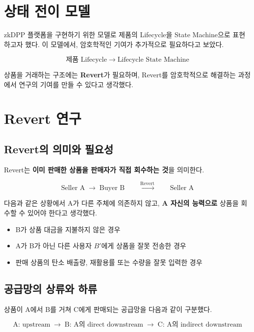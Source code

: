 \documentclass[11pt,a4paper]{extarticle}
\begin{document}
\section{상태 전이 모델}

zkDPP 플랫폼을 구현하기 위한 모델로 제품의 Lifecycle을 State Machine으로
표현하고자 했다. 이 모델에서, 암호학적인 기여가 추가적으로 필요하다고 보았다.

\[
  \boxed{\text{제품 Lifecycle}}
  \;\longrightarrow\;
  \boxed{\text{Lifecycle State Machine}}
\]

상품을 거래하는 구조에는 \textbf{Revert}가 필요하며, Revert를 암호학적으로
해결하는 과정에서 연구의 기여를 만들 수 있다고 생각했다.

\section{Revert 연구}

\subsection{Revert의 의미와 필요성}

Revert는 \textbf{이미 판매한 상품을 판매자가 직접 회수하는 것}을 의미한다.

\[
  \boxed{\text{Seller A}}
  \;\longrightarrow\;
  \boxed{\text{Buyer B}}
  \qquad
  \overset{\text{Revert}}{\longrightarrow}
  \qquad
  \boxed{\text{Seller A}}
\]

다음과 같은 상황에서 A가 다른 주체에 의존하지 않고, \textbf{A 자신의
  능력으로} 상품을 회수할 수 있어야 한다고 생각했다.

\begin{itemize}
  \item B가 상품 대금을 지불하지 않은 경우
  \item A가 B가 아닌 다른 사용자 \(B'\)에게 상품을 잘못 전송한 경우
  \item 판매 상품의 탄소 배출량, 재활용률 또는 수량을 잘못 입력한 경우
\end{itemize}

\subsection{공급망의 상류와 하류}

상품이 A에서 B를 거쳐 C에게 판매되는 공급망을 다음과 같이 구분했다.

\[
  \boxed{\text{A: upstream}}
  \;\longrightarrow\;
  \boxed{\text{B: A의 direct downstream}}
  \;\longrightarrow\;
  \boxed{\text{C: A의 indirect downstream}}
\]
\end{document}

